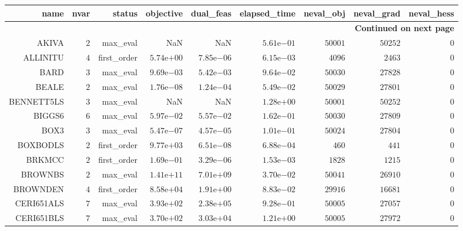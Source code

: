 \begin{longtable}{rrrrrrrrr}
\hline
name & nvar & status & objective & dual\_feas & elapsed\_time & neval\_obj & neval\_grad & neval\_hess \\\hline
\endhead
\hline
\multicolumn{9}{r}{{\bfseries Continued on next page}}\\
\hline
\endfoot
\endlastfoot
AKIVA & \(     2\) & max\_eval &       NaN &       NaN & \( 5.61\)e\(-01\) & \( 50001\) & \( 50252\) & \(     0\) \\
ALLINITU & \(     4\) & first\_order & \( 5.74\)e\(+00\) & \( 7.85\)e\(-06\) & \( 6.15\)e\(-03\) & \(  4096\) & \(  2463\) & \(     0\) \\
BARD & \(     3\) & max\_eval & \( 9.69\)e\(-03\) & \( 5.42\)e\(-03\) & \( 9.64\)e\(-02\) & \( 50030\) & \( 27828\) & \(     0\) \\
BEALE & \(     2\) & max\_eval & \( 1.76\)e\(-08\) & \( 1.24\)e\(-04\) & \( 5.49\)e\(-02\) & \( 50029\) & \( 27801\) & \(     0\) \\
BENNETT5LS & \(     3\) & max\_eval &       NaN &       NaN & \( 1.28\)e\(+00\) & \( 50001\) & \( 50252\) & \(     0\) \\
BIGGS6 & \(     6\) & max\_eval & \( 5.97\)e\(-02\) & \( 5.57\)e\(-02\) & \( 1.62\)e\(-01\) & \( 50030\) & \( 27809\) & \(     0\) \\
BOX3 & \(     3\) & max\_eval & \( 5.47\)e\(-07\) & \( 4.57\)e\(-05\) & \( 1.01\)e\(-01\) & \( 50024\) & \( 27804\) & \(     0\) \\
BOXBODLS & \(     2\) & first\_order & \( 9.77\)e\(+03\) & \( 6.51\)e\(-08\) & \( 6.88\)e\(-04\) & \(   460\) & \(   441\) & \(     0\) \\
BRKMCC & \(     2\) & first\_order & \( 1.69\)e\(-01\) & \( 3.29\)e\(-06\) & \( 1.53\)e\(-03\) & \(  1828\) & \(  1215\) & \(     0\) \\
BROWNBS & \(     2\) & max\_eval & \( 1.41\)e\(+11\) & \( 7.01\)e\(+09\) & \( 3.70\)e\(-02\) & \( 50041\) & \( 26910\) & \(     0\) \\
BROWNDEN & \(     4\) & first\_order & \( 8.58\)e\(+04\) & \( 1.91\)e\(+00\) & \( 8.83\)e\(-02\) & \( 29916\) & \( 16681\) & \(     0\) \\
CERI651ALS & \(     7\) & max\_eval & \( 3.93\)e\(+02\) & \( 2.38\)e\(+05\) & \( 9.28\)e\(-01\) & \( 50005\) & \( 27057\) & \(     0\) \\
CERI651BLS & \(     7\) & max\_eval & \( 3.70\)e\(+02\) & \( 3.03\)e\(+04\) & \( 1.21\)e\(+00\) & \( 50005\) & \( 27972\) & \(     0\) \\

\end{longtable}

